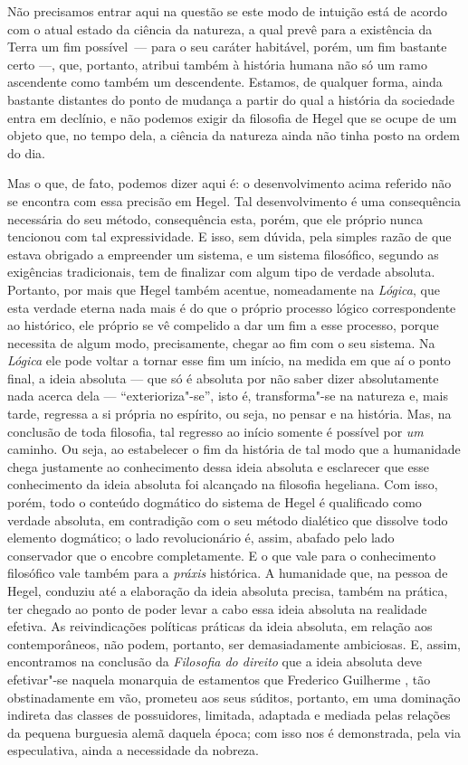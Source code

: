 Não precisamos entrar aqui na questão se este modo de intuição está de
acordo com o atual estado da ciência da natureza, a qual prevê para a
existência da Terra um fim possível~--- para o seu caráter
habitável, porém, um fim bastante certo ---, que, portanto, atribui também
à história humana não só um ramo ascendente como também um descendente.
Estamos, de qualquer forma, ainda bastante distantes do ponto de mudança
a partir do qual a história da sociedade entra em declínio, e não podemos
exigir da filosofia
de Hegel que
se ocupe de um objeto que, no tempo dela, a ciência da natureza ainda
não tinha posto na ordem do dia.

Mas o que, de fato, podemos dizer aqui é: o desenvolvimento acima
referido não se encontra com essa precisão
em Hegel.
Tal desenvolvimento é uma consequência necessária do seu método,
consequência esta, porém, que ele próprio nunca tencionou com tal
expressividade. E isso, sem dúvida, pela simples razão de que estava
obrigado a empreender um sistema, e um sistema filosófico, segundo as
exigências tradicionais, tem de finalizar com algum tipo de verdade
absoluta. Portanto, por mais que Hegel também acentue, nomeadamente
na \emph{Lógica}, que esta verdade eterna
nada mais é do que o próprio processo lógico correspondente ao
histórico, ele próprio se vê compelido a dar um fim a esse processo,
porque necessita de algum modo, precisamente, chegar ao fim com o seu
sistema. Na \emph{Lógica} ele pode voltar a tornar esse fim um início,
na medida em que aí o ponto final, a ideia absoluta --- que só é absoluta por não saber dizer absolutamente nada acerca dela ---
``exterioriza"-se'', isto é, transforma"-se na 
natureza e, mais tarde, regressa a si própria no espírito, ou seja, no
pensar e na história. Mas, na conclusão de toda filosofia, tal regresso
ao início somente é possível por \emph{um} caminho. Ou seja, ao
estabelecer o fim da história de tal modo que a humanidade chega
justamente ao conhecimento dessa ideia absoluta \textbar{} e esclarecer que esse
conhecimento da ideia absoluta foi alcançado na filosofia hegeliana. \textbar{}
Com isso, porém, todo o conteúdo dogmático do sistema
de Hegel é
qualificado como verdade absoluta, em contradição com o seu método
dialético que dissolve todo elemento dogmático; o lado revolucionário é,
assim, abafado pelo lado conservador que o encobre completamente. E o
que vale para o conhecimento filosófico vale também para a
\emph{práxis} histórica. A humanidade que, na pessoa
de Hegel,
conduziu até a elaboração da ideia absoluta precisa, também na prática,
ter chegado ao ponto de poder levar a cabo essa ideia absoluta na
realidade efetiva. As reivindicações políticas práticas da ideia
absoluta, em relação aos contemporâneos, não podem, portanto, ser
demasiadamente ambiciosas. E, assim, encontramos na conclusão
da \emph{Filosofia do direito} que a ideia absoluta deve efetivar"-se
naquela monarquia de estamentos 
que Frederico Guilherme , tão obstinadamente em vão, prometeu aos seus súditos,
portanto, em uma dominação indireta das classes de possuidores,
limitada, adaptada e mediada pelas relações da pequena burguesia alemã
daquela época; com isso nos é demonstrada, pela via especulativa, ainda
a necessidade da nobreza.


